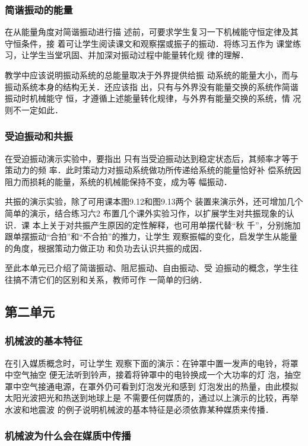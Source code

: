 \subsubsection{简谐振动的能量}

在从能量角度对简谐振动进行描
述前，可要求学生复习一下机械能守恒定律及其守恒条件，接
着可让学生阅读课文和观察摆或振子的振动．将练习五作为
课堂练习，让学生当堂巩固、并加深对振动过程中能量转化规
律的理解．

教学中应该说明振动系统的总能量取决于外界提供给振
动系统的能量大小，而与振动系统本身的结构无关．还应该指
出，只有与外界没有能量交换的系统作简谐振动时机械能守
恒，才遵循上述能量转化规律，与外界有能量交换的系统，情
况则不一定如此．

\subsubsection{受迫振动和共振}

在受迫振动演示实验中，要指出
只有当受迫振动达到稳定状态后，其频率才等于策动力的频
率．此时策动力对振动系统做功所传递给系统的能量恰好补
偿系统因阻力而损耗的能量，系统的机械能保持不变，成为等
幅振动．

共振的演示实验，除了可用课本图9.12和图9.13两个
装置来演示外，还可增加几个简单的演示，结合练习六2
布置几个课外实验习作，以扩展学生对共振现象的认识．课
本上关于对共振产生原因的定性解释，也可用单摆代替“秋
千”，分别施加跟单摆振动“合拍”和“不合拍”的推力，让学生
观察振幅的变化，启发学生从能量的角度，根据策动力做正功
和负功去认识共振的成因．

至此本单元已介绍了简谐振动、阻尼振动、自由振动、受
迫振动的概念，学生往往搞不清它们的区别和关系，教师可作
一简单的归纳．

\subsection{第二单元}
\subsubsection{机械波的基本特征}

在引入媒质概念时，可让学生
观察下面的演示：在钟罩中置一发声的电铃，将罩中空气抽空
便无法听到铃声，接着将钟罩中的电铃换成一个大功率的灯
泡，抽空罩中空气接通电源，在罩外仍可看到灯泡发光和感到
灯泡发出的热量，由此模拟太阳光波把光和热送到地球上是
不需要任何媒质的，通过以上演示的比较，再举水波和地震波
的例子说明机械波的基本特征是必须依靠某种媒质来传播．

\subsubsection{机械波为什么会在媒质中传播}

